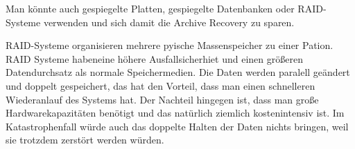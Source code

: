 \begin{flushleft}
Man könnte auch gespiegelte Platten, gespiegelte Datenbanken oder RAID-Systeme verwenden und sich damit die Archive Recovery zu sparen.

RAID-Systeme organisieren mehrere pyische Massenspeicher zu einer Pation. RAID Systeme habeneine höhere Ausfallsicherhiet und einen größeren Datendurchsatz als normale Speichermedien. 
Die Daten werden paralell geändert und doppelt gespeichert, das hat den Vorteil, dass man einen schnelleren Wiederanlauf des Systems hat. Der Nachteil hingegen ist, dass man große Hardwarekapazitäten benötigt und das natürlich ziemlich kostenintensiv ist. Im Katastrophenfall würde auch das doppelte Halten der Daten nichts bringen, weil sie trotzdem zerstört werden würden.
\end{flushleft}